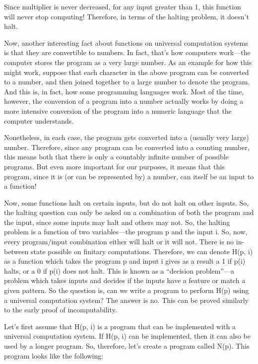 Since multiplier is never decreased, for any input greater than 1, this function will never stop computing!  Therefore, in terms of the halting problem, it doesn't halt.

Now, another interesting fact about functions on universal computation systems is that they are convertible to numbers.  In fact, that's how computers work---the computer stores the program as a very large number.  As an example for how this might work, suppose that each character in the above program can be converted to a number, and then joined together to a large number to denote the program.  And this is, in fact, how some programming languages work.  Most of the time, however, the conversion of a program into a number actually works by doing a more intensive conversion of the program into a numeric language that the computer understands.  

Nonetheless, in each case, the program gets converted into a (usually very large) number.  Therefore, since any program can be converted into a counting number, this means both that there is only a countably infinite number of possible programs.  But even more important for our purposes, it means that this program, since it is (or can be represented by) a number, can itself be an input to a function!

Now, some functions halt on certain inputs, but do not halt on other inputs.  So, the halting question can only be asked on a combination of both the program and the input, since some inputs may halt and others may not.  So, the halting problem is a function of two variables---the program p and the input i.  So, now, every program/input combination either will halt or it will not.  There is no in-between state possible on finitary computations.  Therefore, we can denote H(p, i) as a function which takes the program p and input i gives as a result a 1 if p(i) halts, or a 0 if p(i) does not halt.  This is known as a ``decision problem''---a problem which takes inputs and decides if the inputs have a feature or match a given pattern.  So the question is, can we write a program to perform H(p) using a universal computation system?  The answer is no.  This can be proved similarly to the early proof of incomputability.  

Let's first assume that H(p, i) is a program that can be implemented with a universal computation system.  If H(p, i) can be implemented, then it can also be used by a longer program.  So, therefore, let's create a program called N(p).  This program looks like the following:

